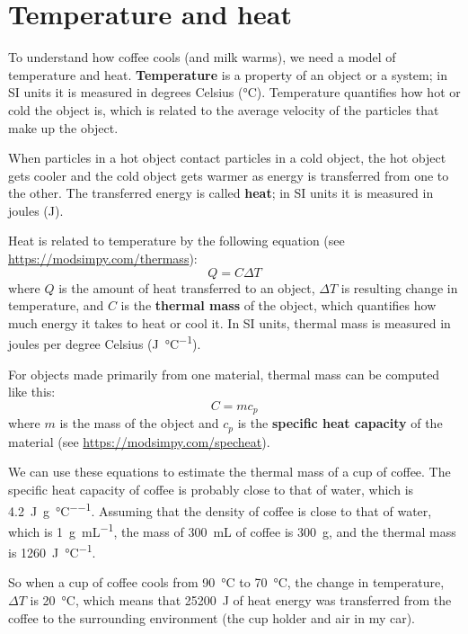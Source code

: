\documentclass[12pt]{book}
\theoremstyle{exercise}
\begin{document}
\section{Temperature and heat}

To understand how coffee cools (and milk warms), we need a model of temperature and heat.  {\bf Temperature} is a property of an object or a system; in SI units it is measured in degrees Celsius (\si{\celsius}).  Temperature quantifies how hot or cold the object is, which is related to the average velocity of the particles that make up the object.


When particles in a hot object contact particles in a cold object, the hot object gets cooler and the cold object gets warmer as energy is transferred from one to the other.  The transferred energy is called {\bf heat}; in SI units it is measured in joules (\si{\joule}).


Heat is related to temperature by the following equation (see \url{https://modsimpy.com/thermass}):
%
\[ Q = C \Delta T \]
%
where $Q$ is the amount of heat transferred to an object, $\Delta T$ is resulting change in temperature, and $C$ is the {\bf thermal mass} of the object, which quantifies how much energy it takes to heat or cool it.  In SI units, thermal mass is measured in joules per degree Celsius (\si{\joule\per\celsius}).


For objects made primarily from one material, thermal mass can be computed like this:
%
\[ C = m c_p \]
%
where $m$ is the mass of the object and $c_p$ is the {\bf specific heat capacity} of the material (see \url{https://modsimpy.com/specheat}).


We can use these equations to estimate the thermal mass of a cup of coffee.  The specific heat capacity of coffee is probably close to that of water, which is \SI{4.2}{\joule\per\gram\per\celsius}.  Assuming that the density of coffee is close to that of water, which is \SI{1}{\gram\per\milli\liter}, the mass of \SI{300}{\milli\liter} of coffee is \SI{300}{\gram}, and the thermal mass is \SI{1260}{\joule\per\celsius}.


So when a cup of coffee cools from \SI{90}{\celsius} to \SI{70}{\celsius}, the change in temperature, $\Delta T$ is \SI{20}{\celsius}, which means that \SI{25200}{\joule} of heat energy was transferred from the coffee to the surrounding environment (the cup holder and air in my car).
\end{document}
